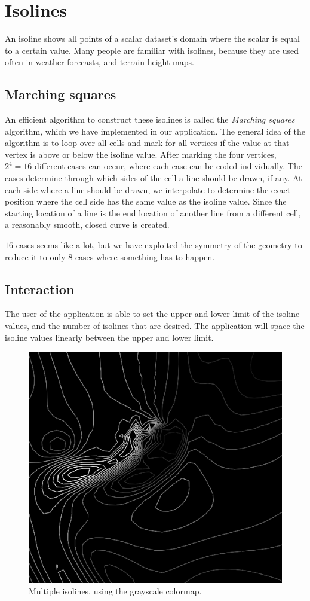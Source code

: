 \section{Isolines}
\label{sec:isolines}
An isoline shows all points of a scalar dataset's domain where the scalar is equal to a certain value.
Many people are familiar with isolines, because they are used often in weather forecasts, and terrain height maps.

\subsection{Marching squares}
An efficient algorithm to construct these isolines is called the \textit{Marching squares}\cite{maple2003geometric} algorithm, which we have implemented in our application.
The general idea of the algorithm is to loop over all cells and mark for all vertices if the value at that vertex is above or below the isoline value.
After marking the four vertices, \(2^4=16\) different cases can occur, where each case can be coded individually.
The cases determine through which sides of the cell a line should be drawn, if any.
At each side where a line should be drawn, we interpolate to determine the exact position where the cell side has the same value as the isoline value.
Since the starting location of a line is the end location of another line from a different cell, a reasonably smooth, closed curve is created.

\(16\) cases seems like a lot, but we have exploited the symmetry of the geometry to reduce it to only \(8\) cases where something has to happen.

\subsection{Interaction}
The user of the application is able to set the upper and lower limit of the isoline values, and the number of isolines that are desired.
The application will space the isoline values linearly between the upper and lower limit.

\begin{figure}[htb]
  \centering
  \includegraphics[width=\linewidth]{./content/pictures/isolines_blackwhite.png}
  \caption{Multiple isolines, using the grayscale colormap.}
\end{figure}
\clearpage